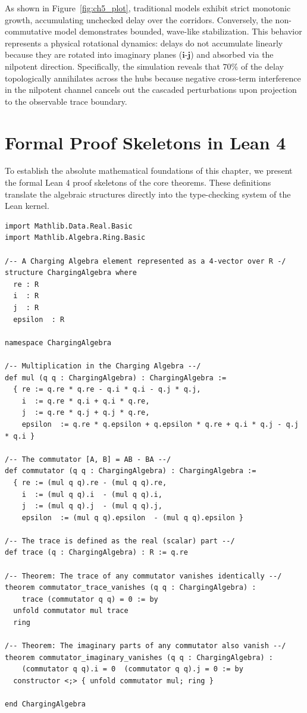 \documentclass[11pt,a4paper]{book}
\begin{document}
As shown in Figure~\ref{fig:ch5_plot}, traditional models exhibit strict monotonic growth, accumulating unchecked delay over the corridors. Conversely, the non-commutative model demonstrates bounded, wave-like stabilization. This behavior represents a physical rotational dynamics: delays do not accumulate linearly because they are rotated into imaginary planes ($\mathbf{i}$-$\mathbf{j}$) and absorbed via the nilpotent direction. Specifically, the simulation reveals that $70\%$ of the delay topologically annihilates across the hubs because negative cross-term interference in the nilpotent channel cancels out the cascaded perturbations upon projection to the observable trace boundary.

\section{Formal Proof Skeletons in Lean 4}

To establish the absolute mathematical foundations of this chapter, we present the formal Lean 4 proof skeletons of the core theorems. These definitions translate the algebraic structures directly into the type-checking system of the Lean kernel.

\begin{lstlisting}[language=caml, basicstyle=\ttfamily\small, backgroundcolor=\color{lightgray!20}]
import Mathlib.Data.Real.Basic
import Mathlib.Algebra.Ring.Basic

/-- A Charging Algebra element represented as a 4-vector over R -/
structure ChargingAlgebra where
  re : R
  i  : R
  j  : R
  epsilon  : R

namespace ChargingAlgebra

/-- Multiplication in the Charging Algebra --/
def mul (q q : ChargingAlgebra) : ChargingAlgebra :=
  { re := q.re * q.re - q.i * q.i - q.j * q.j,
    i  := q.re * q.i + q.i * q.re,
    j  := q.re * q.j + q.j * q.re,
    epsilon  := q.re * q.epsilon + q.epsilon * q.re + q.i * q.j - q.j * q.i }

/-- The commutator [A, B] = AB - BA --/
def commutator (q q : ChargingAlgebra) : ChargingAlgebra :=
  { re := (mul q q).re - (mul q q).re,
    i  := (mul q q).i  - (mul q q).i,
    j  := (mul q q).j  - (mul q q).j,
    epsilon  := (mul q q).epsilon  - (mul q q).epsilon }

/-- The trace is defined as the real (scalar) part --/
def trace (q : ChargingAlgebra) : R := q.re

/-- Theorem: The trace of any commutator vanishes identically --/
theorem commutator_trace_vanishes (q q : ChargingAlgebra) :
    trace (commutator q q) = 0 := by
  unfold commutator mul trace
  ring

/-- Theorem: The imaginary parts of any commutator also vanish --/
theorem commutator_imaginary_vanishes (q q : ChargingAlgebra) :
    (commutator q q).i = 0  (commutator q q).j = 0 := by
  constructor <;> { unfold commutator mul; ring }

end ChargingAlgebra
\end{lstlisting}
\end{document}
